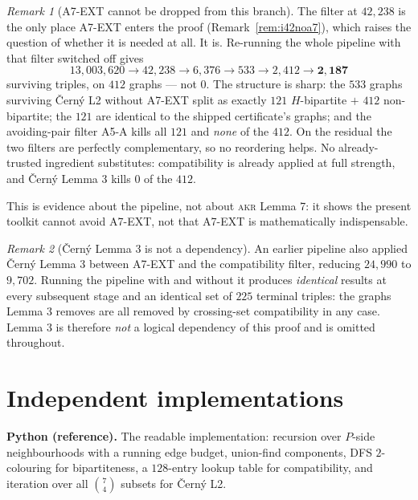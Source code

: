 \documentclass[11pt,a4paper]{article}
\theoremstyle{plain}
\theoremstyle{definition}
\theoremstyle{remark}
\newtheorem*{remark}{Remark}
\begin{document}
\begin{remark}[\textsf{A7-EXT} cannot be dropped from this branch]\label{rem:noa7}
The filter at $42{,}238$ is the only place \textsf{A7-EXT} enters the proof
(Remark~\ref{rem:i42noa7}), which raises the question of whether it is needed at
all. It is. Re-running the whole pipeline with that filter switched off gives
\[
  13{,}003{,}620 \to 42{,}238 \to 6{,}376 \to 533 \to 2{,}412 \to \mathbf{2{,}187}
\]
surviving triples, on $412$ graphs --- not $0$. The structure is sharp: the $533$
graphs surviving {\v C}ern{\'y} L2 without \textsf{A7-EXT} split as exactly
$121$ $H$-bipartite $+$ $412$ non-bipartite; the $121$ are identical to the
shipped certificate's graphs; and the avoiding-pair filter \textsf{A5-A} kills
all $121$ and \emph{none} of the $412$. On the residual the two filters are
perfectly complementary, so no reordering helps. No already-trusted ingredient
substitutes: compatibility is already applied at full strength, and
{\v C}ern{\'y} Lemma 3 kills $0$ of the $412$.

This is evidence about the pipeline, not about \textsc{akr} Lemma 7: it shows the
present toolkit cannot avoid \textsf{A7-EXT}, not that \textsf{A7-EXT} is
mathematically indispensable.
\end{remark}

\begin{remark}[{\v C}ern{\'y} Lemma 3 is not a dependency]
An earlier pipeline also applied {\v C}ern{\'y} Lemma 3 between \textsf{A7-EXT} and
the compatibility filter, reducing $24{,}990$ to $9{,}702$. Running the pipeline
with and without it produces \emph{identical} results at every subsequent stage
and an identical set of $225$ terminal triples: the graphs Lemma 3 removes are
all removed by crossing-set compatibility in any case. Lemma 3 is therefore
\emph{not} a logical dependency of this proof and is omitted throughout.
\end{remark}

\section{Independent implementations}\label{sec:impl}

\textbf{Python (reference).} The readable implementation: recursion over
$P$-side neighbourhoods with a running edge budget, union-find components,
DFS $2$-colouring for bipartiteness, a $128$-entry lookup table for
compatibility, and iteration over all $\binom{7}{4}$ subsets for {\v C}ern{\'y}
L2.
\end{document}
